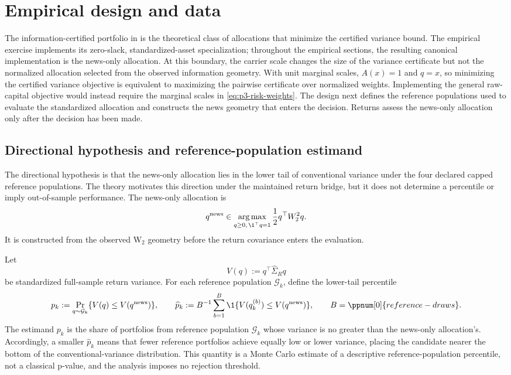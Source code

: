 \section{Empirical design and data}\label{sec:empirical-design}

The information-certified portfolio in  is the
theoretical class of allocations that minimize the certified variance bound.
The empirical exercise implements its zero-slack, standardized-asset
specialization; throughout the empirical sections, the resulting canonical
implementation is the news-only allocation.
At this boundary, the carrier scale changes the size of the variance certificate
but not the normalized allocation selected from the observed information
geometry.
With unit marginal scales, $A(x)=1$ and $q=x$, so minimizing the certified
variance objective is equivalent to maximizing the pairwise certificate over
normalized weights.
Implementing the general raw-capital objective would instead require the
marginal scales in \eqref{eq:p3-risk-weights}.
The design next defines the reference populations used to evaluate the
standardized allocation and constructs the news geometry that enters the
decision.
Returns assess the news-only allocation only after the decision has been made.

\subsection{Directional hypothesis and reference-population estimand}
\label{sec:p3-reference-populations}

The directional hypothesis is that the news-only allocation lies in
the lower tail of conventional variance under the four declared capped
reference populations.
The theory motivates this direction under the maintained return bridge, but it
does not determine a percentile or imply out-of-sample performance.
The news-only allocation is
\[
  q^{\mathrm{news}}\in
  \operatorname*{arg\,max}_{q\ge0,\,\1^\top q=1}
  \frac12q^\top W_2^2q.
\]
It is constructed from the observed W$_2$ geometry before the return covariance
enters the evaluation.

Let
\[
  V(q):=q^\top\widehat\Sigma_R q
\]
be standardized full-sample return variance.
For each reference population $\mathcal G_k$, define the lower-tail
percentile
\[
  p_k:=\Pr_{q\sim\mathcal G_k}
  \{V(q)\le V(q^{\mathrm{news}})\},
  \qquad
  \widehat p_k:=B^{-1}\sum_{b=1}^{B}
  \1\{V(q_k^{(b)})\le V(q^{\mathrm{news}})\},
  \qquad
  B=\ppnum[0]{reference-draws}.
\]
The estimand $p_k$ is the share of portfolios from reference population
$\mathcal G_k$ whose variance is no greater than the news-only allocation's.
Accordingly, a smaller $\widehat p_k$ means that fewer reference portfolios
achieve equally low or lower variance, placing the candidate nearer the bottom
of the conventional-variance distribution.
This quantity is a Monte Carlo estimate of a descriptive reference-population
percentile, not a classical p-value, and the analysis imposes no rejection
threshold.

